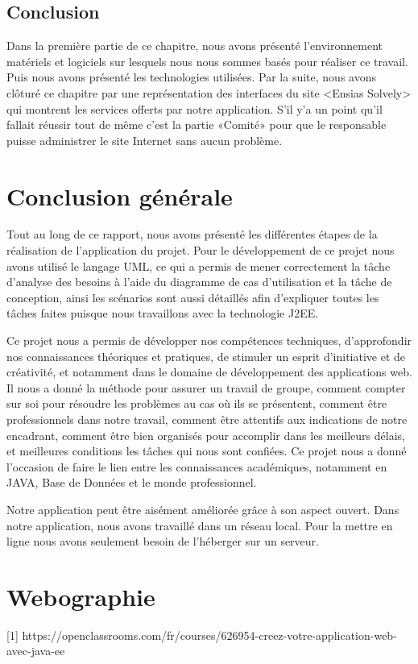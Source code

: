 \documentclass[11.5pt]{report}
\begin{document}
\section{Conclusion}
Dans la première partie de ce chapitre, nous avons présenté l’environnement matériels et logiciels sur lesquels nous nous sommes basés pour réaliser ce travail. Puis nous avons  présenté les technologies utilisées. Par la suite, nous avons clôturé ce chapitre par une représentation des interfaces du site <Ensias Solvely> qui montrent les services offerts par notre application. S’il y’a un point qu’il fallait réussir tout de même c’est la partie «Comité» pour que le responsable puisse administrer le site Internet sans aucun problème.
	
\chapter*{Conclusion générale}
Tout au long de ce rapport, nous avons présenté les différentes étapes de la réalisation de l’application du projet. Pour le développement de ce projet nous avons 
utilisé le langage UML, ce qui a permis de mener correctement la tâche d’analyse des besoins à l’aide du diagramme de cas d’utilisation et la tâche de conception, ainsi les scénarios sont aussi détaillés afin d’expliquer toutes les tâches faites puisque nous travaillons avec la technologie J2EE.

Ce projet nous a permis de développer nos compétences techniques, d’approfondir nos connaissances théoriques et pratiques, de stimuler un esprit d’initiative et de créativité, et notamment dans le domaine de développement des applications web. Il nous a donné la méthode pour assurer un travail de groupe, comment compter sur soi pour résoudre les problèmes au cas où ils se présentent, comment être professionnels dans notre travail, comment être attentifs aux indications de notre encadrant, comment être bien organisés pour accomplir dans les meilleurs délais, et meilleures conditions les tâches qui nous sont confiées. Ce projet nous a donné l’occasion de faire le lien entre les connaissances académiques, notamment en JAVA, Base de Données et le monde professionnel.

Notre application peut être aisément améliorée grâce à son aspect ouvert. Dans notre application, nous avons travaillé dans un réseau local. Pour la mettre en ligne nous avons seulement besoin de l’héberger sur un serveur.
\chapter*{Webographie}
[1]   https://openclassrooms.com/fr/courses/626954-creez-votre-application-web-avec-java-ee\\
\end{document}
